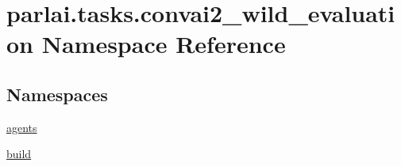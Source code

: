 \hypertarget{namespaceparlai_1_1tasks_1_1convai2__wild__evaluation}{}\section{parlai.\+tasks.\+convai2\+\_\+wild\+\_\+evaluation Namespace Reference}
\label{namespaceparlai_1_1tasks_1_1convai2__wild__evaluation}
\subsection*{Namespaces}
\begin{DoxyCompactItemize}
\item 
 \hyperlink{namespaceparlai_1_1tasks_1_1convai2__wild__evaluation_1_1agents}{agents}
\item 
 \hyperlink{namespaceparlai_1_1tasks_1_1convai2__wild__evaluation_1_1build}{build}
\end{DoxyCompactItemize}
